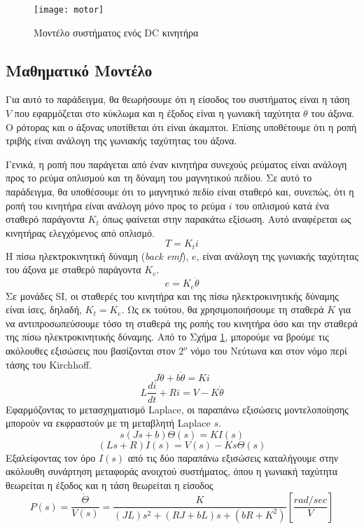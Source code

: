 \begin{figure}[h]
  \centering
  \texttt{[image: motor]}
  \caption{Μοντέλο συστήματος ενός DC κινητήρα}
  \label{fig:motor}
\end{figure}

\subsection{Μαθηματικό Μοντέλο}

Για αυτό το παράδειγμα, θα θεωρήσουμε ότι η είσοδος του συστήματος είναι η τάση $V$ που εφαρμόζεται στο κύκλωμα και η έξοδος είναι η γωνιακή ταχύτητα $\dot{\theta}$ του άξονα. Ο ρότορας και ο άξονας υποτίθεται ότι είναι άκαμπτοι. Επίσης υποθέτουμε ότι η ροπή τριβής είναι ανάλογη της γωνιακής ταχύτητας του άξονα.

Γενικά, η ροπή που παράγεται από έναν κινητήρα συνεχούς ρεύματος είναι ανάλογη προς το ρεύμα οπλισμού και τη δύναμη του μαγνητικού πεδίου. Σε αυτό το παράδειγμα, θα υποθέσουμε ότι το μαγνητικό πεδίο είναι σταθερό και, συνεπώς, ότι η ροπή του κινητήρα είναι ανάλογη μόνο προς το ρεύμα $i$ του οπλισμού κατά ένα σταθερό παράγοντα $K_t$ όπως φαίνεται στην παρακάτω εξίσωση. Αυτό αναφέρεται ως κινητήρας ελεγχόμενος από οπλισμό.
\begin{equation}
T = K_ti
\end{equation}
Η πίσω ηλεκτροκινητική δύναμη (\emph{back emf}), $e$, είναι ανάλογη της γωνιακής ταχύτητας του άξονα με σταθερό παράγοντα $K_e$.
\begin{equation}
e = K_e\dot{\theta}
\end{equation}
Σε μονάδες SI, οι σταθερές του κινητήρα και της πίσω ηλεκτροκινητικής δύναμης είναι ίσες, δηλαδή, $K_t = K_e$. Ως εκ τούτου, θα χρησιμοποιήσουμε τη σταθερά $K$ για να αντιπροσωπεύσουμε τόσο τη σταθερά της ροπής του κινητήρα όσο και την σταθερά της πίσω ηλεκτροκινητικής δύναμης. Από το Σχήμα \ref{fig:motor}, μπορούμε να βρούμε τις ακόλουθες εξισώσεις που βασίζονται στον $2^o$ νόμο του Νεύτωνα και στον νόμο περί τάσης του Kirchhoff.
\begin{equation}
J\ddot{\theta} + b\dot{\theta} = Ki
\end{equation}
\begin{equation}
L\frac{di}{dt} + Ri = V - K\dot{\theta}
\end{equation}
Εφαρμόζοντας το μετασχηματισμό Laplace, οι παραπάνω εξισώσεις μοντελοποίησης μπορούν να εκφραστούν με τη μεταβλητή Laplace $s$.
\begin{equation}
s(Js+b)\Theta(s) = KI(s)
\end{equation}
\begin{equation}
(Ls+R)I(s) = V(s) - Ks\Theta(s)
\end{equation}
Εξαλείφοντας τον όρο $I(s)$ από τις δύο παραπάνω εξισώσεις καταλήγουμε στην ακόλουθη συνάρτηση μεταφοράς ανοιχτού συστήματος, όπου η γωνιακή ταχύτητα θεωρείται η έξοδος και η τάση θεωρείται η είσοδος
\begin{equation}
P(s) = \frac{\dot{\Theta}}{V(s)} = \frac{K}{(JL)s^2+(RJ+bL)s+(bR+K^2)} \left[\frac{rad/sec}{V}\right]
\label{eq:motor_laplace}
\end{equation}

